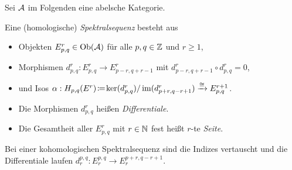 \documentclass{cheat-sheet}
\begin{document}


Sei $\mathcal{A}$ im Folgenden eine abelsche Kategorie.

\begin{defn}
  Eine (homologische) \emph{Spektralsequenz} besteht aus
  \begin{itemize}
    \item Objekten $E^r_{p,q} \in \operatorname{Ob}(\mathcal{A})$ für alle $p, q \in \mathbb{Z}$ und $r \geq 1$,
    \item Morphismen $d^r_{p,q} : E^r_{p,q} \to E^r_{p-r,q+r-1}$ mit $d^r_{p-r,q+r-1} \circ d^r_{p,q} = 0$,
    \item und Isos $\alpha : H_{p,q}(E^r) \!\coloneqq\! \ker(d^r_{p,q}) / \operatorname{im}(d^r_{p+r,q-r+1}) \xrightarrow{\cong} E^{r+1}_{p,q}$.
  \end{itemize}
\end{defn}


\begin{sprech}
  \begin{itemize}
    \item Die Morphismen $d^r_{p,q}$ heißen \emph{Differentiale}.
    \item Die Gesamtheit aller $E^r_{p,q}$ mit $r \in \mathbb{N}$ fest heißt $r$-te \emph{Seite}.
  \end{itemize}
\end{sprech}

\begin{bem}
  Bei einer kohomologischen Spektralsequenz sind die Indizes vertauscht und die Differentiale laufen $d_r^{p,q} : E_r^{p,q} \to E_r^{p+r,q-r+1}$.
\end{bem}
\end{document}
